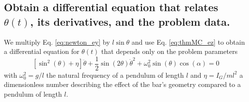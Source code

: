 \documentclass[11pt,a4paper]{exam}
\begin{document}
\begin{parts}
\part{Obtain a differential equation that relates $\theta(t)$, its derivatives, and the problem data.}
    \par\vspace{2mm}
    We multiply Eq. \eqref{eq:newton_ey} by $l\sin\theta$ and use Eq. \eqref{eq:thmMC_ez} to obtain a differential equation for $\theta(t)$ that depends only on the problem parameters
    \begin{equation}
        \left[\sin^2(\theta) +\eta\right]\ddot\theta +\frac{1}{2}\sin(2\theta)\dot\theta^2 + \omega_0^2\sin(\theta) \cos(\alpha) = 0 \label{eq:Eqdumvt}
    \end{equation}
    with $\omega_0^2=g/l$ the natural frequency of a pendulum of length $l$ and $\eta=I_G/ml^2$ a dimensionless number describing the effect of the bar's geometry compared to a pendulum of length $l$. 

\end{parts}
\end{document}
